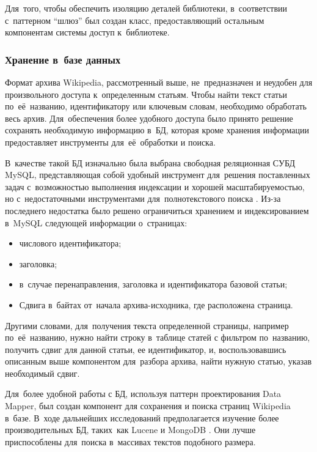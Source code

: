Для~того, чтобы обеспечить изоляцию деталей библиотеки, 
в~соответствии с~паттерном ``шлюз'' \cite{patternGateway} был создан класс, 
предоставляющий остальным компонентам системы доступ к~библиотеке.

\subsubsection{Хранение в~базе данных}

Формат архива Wikipedia, рассмотренный выше, не~предназначен и неудобен для произвольного доступа к~определенным статьям. 
Чтобы найти текст статьи по~её~названию, идентификатору или ключевым словам,
необходимо обработать весь архив.
Для~обеспечения более удобного доступа было принято решение сохранять необходимую информацию в~БД,
которая кроме хранения информации предоставляет инструменты для~её~обработки и поиска.

В~качестве такой БД изначально была выбрана свободная реляционная 
СУБД MySQL, представляющая собой удобный инструмент для~решения поставленных задач 
с~возможностью выполнения индексации и хорошей масштабируемостью, 
но с~недостаточными инструментами для~полнотекстового поиска \cite{mysql}.
Из-за последнего недостатка было решено ограничиться хранением и индексированием в~MySQL следующей информации о~страницах:

\begin{itemize}

\item{числового идентификатора;}
\item {заголовка;}
\item {в~случае перенаправления, заголовка и идентификатора базовой статьи;}

\item {
Сдвига в~байтах от~начала архива-исходника, 
где расположена страница.
}

\end{itemize}

Другими словами, для~получения текста определенной страницы, например по~её~названию,
нужно найти строку в~таблице статей с фильтром по~названию,
получить сдвиг для данной статьи, ее идентификатор, и, 
воспользовавшись описанным выше компонентом для~разбора архива, найти нужную статью, 
указав необходимый сдвиг.

Для~более удобной работы с БД, используя паттерн проектирования Data Mapper\cite{patternMapper}, 
был создан компонент для сохранения и поиска страниц Wikipedia в~базе.
В~ходе дальнейших исследований предполагается изучение более производительных БД, таких~как 
Lucene \cite{lucene} и 
MongoDB \cite{mongoDB}. 
Они лучше приспособлены для~поиска в~массивах текстов подобного размера.

